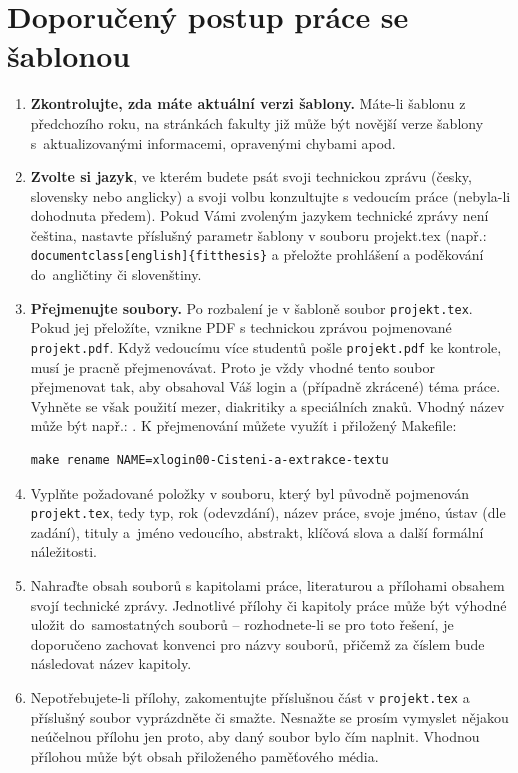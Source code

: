\section{Doporučený postup práce se šablonou}

\begin{enumerate}
  \item \textbf{Zkontrolujte, zda máte aktuální verzi šablony.} Máte-li šablonu z předchozího roku, na stránkách fakulty již může být novější verze šablony s~aktualizovanými informacemi, opravenými chybami apod.
  \item \textbf{Zvolte si jazyk}, ve kterém budete psát svoji technickou zprávu (česky, slovensky nebo anglicky) a svoji volbu konzultujte s vedoucím práce (nebyla-li dohodnuta předem). Pokud Vámi zvoleným jazykem technické zprávy není čeština, nastavte příslušný parametr šablony v souboru projekt.tex (např.: \verb|document|\verb|class[english]{fitthesis}| a přeložte prohlášení a poděkování do~angličtiny či slovenštiny.
  \item \textbf{Přejmenujte soubory.} Po rozbalení je v šabloně soubor \texttt{projekt.tex}. Pokud jej přeložíte, vznikne PDF s technickou zprávou pojmenované \texttt{projekt.pdf}. Když vedoucímu více studentů pošle \texttt{projekt.pdf} ke kontrole, musí je pracně přejmenovávat. Proto je vždy vhodné tento soubor přejmenovat tak, aby obsahoval Váš login a (případně zkrácené) téma práce. Vyhněte se však použití mezer, diakritiky a speciálních znaků. Vhodný název může být např.: . K přejmenování můžete využít i přiložený Makefile:
\begin{verbatim}
make rename NAME=xlogin00-Cisteni-a-extrakce-textu
\end{verbatim}
  \item Vyplňte požadované položky v souboru, který byl původně pojmenován \texttt{projekt.tex}, tedy typ, rok (odevzdání), název práce, svoje jméno, ústav (dle zadání), tituly a~jméno vedoucího, abstrakt, klíčová slova a další formální náležitosti.
  \item Nahraďte obsah souborů s kapitolami práce, literaturou a přílohami obsahem svojí technické zprávy. Jednotlivé přílohy či kapitoly práce může být výhodné uložit do~samostatných souborů -- rozhodnete-li se pro toto řešení, je doporučeno zachovat konvenci pro názvy souborů, přičemž za číslem bude následovat název kapitoly. 
  \item Nepotřebujete-li přílohy, zakomentujte příslušnou část v \texttt{projekt.tex} a příslušný soubor vyprázdněte či smažte. Nesnažte se prosím vymyslet nějakou neúčelnou přílohu jen proto, aby daný soubor bylo čím naplnit. Vhodnou přílohou může být obsah přiloženého paměťového média.

\end{enumerate}
